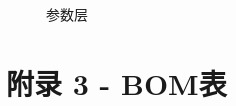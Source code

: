 \documentclass[a4paper]{ctexart}
\begin{document}
\begin{appendices}
		\begin{figure}[H]
		\centering
		\setlength{\leftskip}{-42.5pt}
		\caption{参数层}
	\end{figure}
	
	\newpage
	\newpage
	\newpage
	\section{附录 3 - BOM表}
	

\end{appendices}
\end{document}
